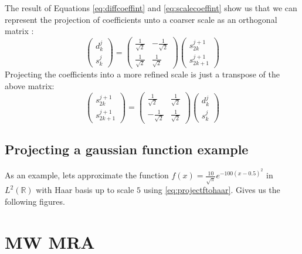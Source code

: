 \documentclass[../master_thesis.tex]{subfiles}
\begin{document}
The result of Equations \ref{eq:diffcoeffint} and \ref{eq:scalecoeffint} show us
that we can represent the projection of coefficients unto a coarser scale as an
orthogonal matrix \cite{Sorland, Beylkin:MRA}:
\begin{equation}
  \begin{pmatrix}
    d^{j}_k \\
    s^{j}_k
  \end{pmatrix} =
  \begin{pmatrix}
    \frac{1}{\sqrt{2}} & -\frac{1}{\sqrt{2}} \\
    \frac{1}{\sqrt{2}} & \frac{1}{\sqrt{2}}
  \end{pmatrix}
  \begin{pmatrix}
    s^{j+1}_{2k} \\
    s^{j+1}_{2k+1}
  \end{pmatrix}
\end{equation}
Projecting the coefficients into a more refined scale is just a transpose of the
above matrix:
\begin{equation}
  \begin{pmatrix}
    s^{j+1}_{2k} \\
    s^{j+1}_{2k+1}
  \end{pmatrix} =
  \begin{pmatrix}
    \frac{1}{\sqrt{2}} & \frac{1}{\sqrt{2}} \\
    -\frac{1}{\sqrt{2}} & \frac{1}{\sqrt{2}}
  \end{pmatrix}
  \begin{pmatrix}
    d^{j}_k \\
    s^{j}_k
  \end{pmatrix}
\end{equation}
\subsection{Projecting a gaussian function example}
As an example, lets approximate the function
$f(x) = \frac{10}{\sqrt{\pi}}e^{-100(x - 0.5)^2}$ in $L^2(\mathbb{R})$
with Haar basis up to scale $5$ using \ref{eq:projectftohaar}. Gives us the
following figures.

\section{\ac{MW} \ac{MRA}}
\end{document}
